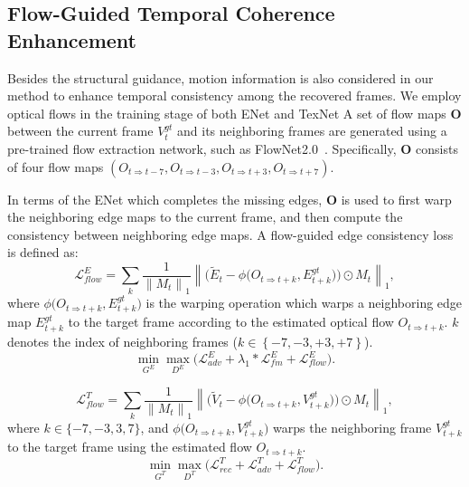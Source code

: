  

\subsection{Flow-Guided Temporal Coherence Enhancement}
\label{sec:fec}
Besides the structural guidance, motion information is also considered in our method to enhance temporal consistency among the recovered frames.
We employ optical flows in the training stage of both ENet and TexNet 
A set of flow maps \(\boldsymbol{O}\) between the current frame $V_t^{gt}$ and its neighboring frames are generated using a pre-trained flow extraction network, such as FlowNet2.0~\cite{Flownet_2017_CVPR}.
Specifically, \(\boldsymbol{O}\) consists of four flow maps \((O_{t\Rightarrow t-7}, O_{t\Rightarrow t-3}, O_{t\Rightarrow t+3}, O_{t\Rightarrow t+7})\).
 
 
In terms of the ENet which completes the missing edges, \(\boldsymbol{O}\) is used to first warp the neighboring edge maps to the current frame, and then compute the consistency between neighboring edge maps.  
A flow-guided edge consistency loss is defined as:
%
\begin{equation}
	\label{eq:flow_edge}
	\mathcal{L}^E_{flow}=\sum_{k}\frac{1}{\left\|M_{t} \right\|_1}\left\|\Big(\widetilde{E}_{t}-\phi\big(O_{t\Rightarrow t+k},E_{t+k}^{gt}\big)\Big)\odot M_{t}\right\|_1,
\end{equation}
where $\phi\big(O_{t\Rightarrow t+k},E_{t+k}^{gt}\big)$ is the warping operation which warps a neighboring edge map $E_{t+k}^{gt}$ to the target frame according to the estimated optical flow $O_{t\Rightarrow t+k}$.
$k$ denotes the index of neighboring frames ($k\in \left\{-7,-3,+3,+7 \right\}$). 
\begin{equation}
\label{eq:loss_e}
\min\limits_{G^E} \max \limits_{D^E} \big(\mathcal{L}^E_{adv}+\lambda_1 * \mathcal{L}^E_{fm}+\mathcal{L}^E_{flow}\big).
\end{equation}

 

\begin{equation}
	\label{eq:inp_flow}
		\mathcal{L}^T_{flow}=\sum_{k}\frac{1}{\left\|M_{t} \right\|_1}\left\|\Big(\widetilde{V}_{t}-\phi\big(O_{t\Rightarrow t+k},V_{t+k}^{gt}\big)\Big)\odot M_{t}\right\|_1,
	\end{equation}
where $k \in \{-7,-3, 3, 7\}$, and $\phi\big(O_{t\Rightarrow t+k},V_{t+k}^{gt}\big)$ warps the neighboring frame $V_{t+k}^{gt}$ to the target frame using the estimated flow $O_{t\Rightarrow t+k}$. 
\begin{equation}
\label{eq:1_}
\min\limits_{G^T} \max \limits_{D^T} \big(\mathcal{L}^{T}_{rec}+\mathcal{L}^T_{adv} +\mathcal{L}^T_{flow}\big).
\end{equation}

